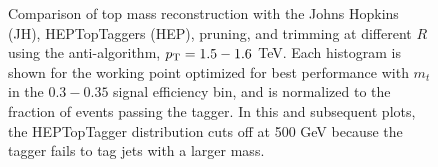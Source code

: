 \begin{figure}
\caption{Comparison of top mass reconstruction with the Johns Hopkins (JH), HEPTopTaggers (HEP), pruning, and trimming at different $R$ using the anti-\kT algorithm, $p_{\rm T}=1.5-1.6$ TeV. Each histogram is shown for the working point optimized for best performance with $m_t$ in the $0.3-0.35$ signal efficiency bin, and is normalized to the fraction of events passing the tagger. In this and subsequent plots, the HEPTopTagger distribution cuts off at 500 GeV because the tagger fails to tag jets with a larger mass.}
\label{fig:topmass_histogram_HEP_JH}
\end{figure}

